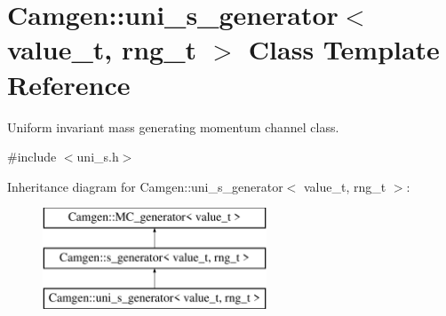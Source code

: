 \hypertarget{a00542}{\section{Camgen\-:\-:uni\-\_\-s\-\_\-generator$<$ value\-\_\-t, rng\-\_\-t $>$ Class Template Reference}
\label{a00542}
}


Uniform invariant mass generating momentum channel class.  




{\ttfamily \#include $<$uni\-\_\-s.\-h$>$}

Inheritance diagram for Camgen\-:\-:uni\-\_\-s\-\_\-generator$<$ value\-\_\-t, rng\-\_\-t $>$\-:\begin{figure}[H]
\begin{center}
\leavevmode
\includegraphics[height=3.000000cm]{a00542}
\end{center}
\end{figure}

